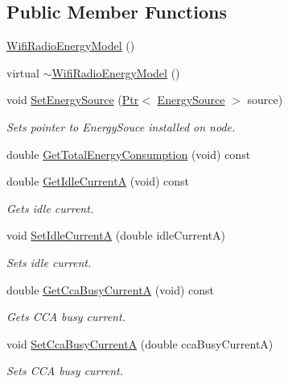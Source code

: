 \subsection*{Public Member Functions}
\begin{DoxyCompactItemize}
\item 
\hyperlink{classns3_1_1WifiRadioEnergyModel_a6b0e21d95458627bd77d2dc7cbed349b}{Wifi\+Radio\+Energy\+Model} ()
\item 
virtual \hyperlink{classns3_1_1WifiRadioEnergyModel_aa12892f55c0f8ad1ed9b12895ce4fa7d}{$\sim$\+Wifi\+Radio\+Energy\+Model} ()
\item 
void \hyperlink{classns3_1_1WifiRadioEnergyModel_a6ac586c77ee4ac849e6b09bd4caf0cf4}{Set\+Energy\+Source} (\hyperlink{classns3_1_1Ptr}{Ptr}$<$ \hyperlink{classns3_1_1EnergySource}{Energy\+Source} $>$ source)
\begin{DoxyCompactList}\small\item\em Sets pointer to Energy\+Souce installed on node. \end{DoxyCompactList}\item 
double \hyperlink{classns3_1_1WifiRadioEnergyModel_a6c002cb4aca61eebb75f112ae297a583}{Get\+Total\+Energy\+Consumption} (void) const 
\item 
double \hyperlink{classns3_1_1WifiRadioEnergyModel_a50648b907f718a5dce9f3c390dcae9ca}{Get\+Idle\+CurrentA} (void) const 
\begin{DoxyCompactList}\small\item\em Gets idle current. \end{DoxyCompactList}\item 
void \hyperlink{classns3_1_1WifiRadioEnergyModel_ae369caec0e9b39a4f290b149b4efea9a}{Set\+Idle\+CurrentA} (double idle\+CurrentA)
\begin{DoxyCompactList}\small\item\em Sets idle current. \end{DoxyCompactList}\item 
double \hyperlink{classns3_1_1WifiRadioEnergyModel_a3f4f6e6e4811c7d58b0175e5e7abf9f9}{Get\+Cca\+Busy\+CurrentA} (void) const 
\begin{DoxyCompactList}\small\item\em Gets C\+CA busy current. \end{DoxyCompactList}\item 
void \hyperlink{classns3_1_1WifiRadioEnergyModel_a410e1aaf4e722c5f6dd8950df79b5eae}{Set\+Cca\+Busy\+CurrentA} (double cca\+Busy\+CurrentA)
\begin{DoxyCompactList}\small\item\em Sets C\+CA busy current. \end{DoxyCompactList}\item 

\end{DoxyCompactItemize}
